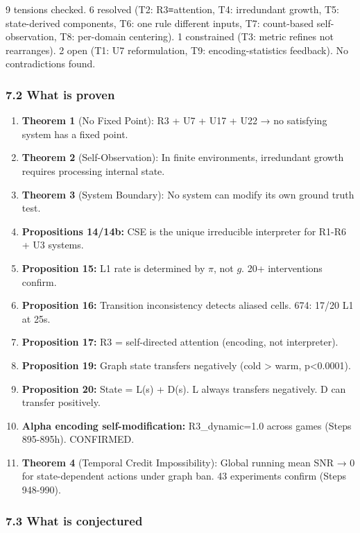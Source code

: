 \documentclass[
  11pt,
]{article}
\providecommand{\tightlist}{%
  \setlength{\itemsep}{0pt}\setlength{\parskip}{0pt}}
\begin{document}
9 tensions checked. 6 resolved (T2: R3≡attention, T4: irredundant
growth, T5: state-derived components, T6: one rule different inputs, T7:
count-based self-observation, T8: per-domain centering). 1 constrained
(T3: metric refines not rearranges). 2 open (T1: U7 reformulation, T9:
encoding-statistics feedback). No contradictions found.

\subsubsection{7.2 What is proven}\label{what-is-proven}

\begin{enumerate}
\def\labelenumi{\arabic{enumi}.}
\tightlist
\item
  \textbf{Theorem 1} (No Fixed Point): R3 + U7 + U17 + U22 → no
  satisfying system has a fixed point.
\item
  \textbf{Theorem 2} (Self-Observation): In finite environments,
  irredundant growth requires processing internal state.
\item
  \textbf{Theorem 3} (System Boundary): No system can modify its own
  ground truth test.
\item
  \textbf{Propositions 14/14b:} CSE is the unique irreducible
  interpreter for R1-R6 + U3 systems.
\item
  \textbf{Proposition 15:} L1 rate is determined by \(\pi\), not \(g\).
  20+ interventions confirm.
\item
  \textbf{Proposition 16:} Transition inconsistency detects aliased
  cells. 674: 17/20 L1 at 25s.
\item
  \textbf{Proposition 17:} R3 = self-directed attention (encoding, not
  interpreter).
\item
  \textbf{Proposition 19:} Graph state transfers negatively (cold
  \textgreater{} warm, p\textless0.0001).
\item
  \textbf{Proposition 20:} State = L(s) + D(s). L always transfers
  negatively. D can transfer positively.
\item
  \textbf{Alpha encoding self-modification:} R3\_dynamic=1.0 across
  games (Steps 895-895h). CONFIRMED.
\item
  \textbf{Theorem 4} (Temporal Credit Impossibility): Global running
  mean SNR → 0 for state-dependent actions under graph ban. 43
  experiments confirm (Steps 948-990).
\end{enumerate}

\subsubsection{7.3 What is conjectured}\label{what-is-conjectured}
\end{document}
